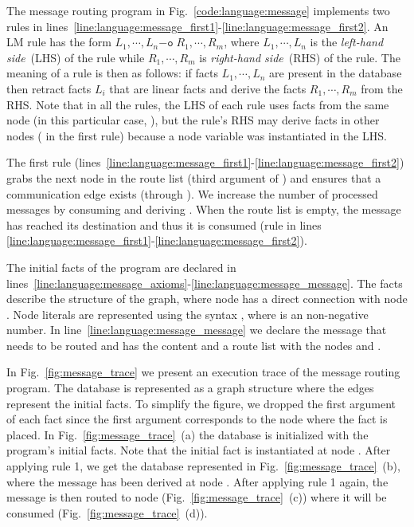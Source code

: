The message routing program in Fig.~\ref{code:language:message} implements two
rules in
lines~\ref{line:language:message_first1}-\ref{line:language:message_first2}. An
LM rule has the form $L_1, \cdots, L_n \mathtt{-o} \; R_1, \cdots, R_m$, where
$L_1, \cdots, L_n$ is the \emph{left-hand side}~(LHS) of the rule while $R_1,
\cdots, R_m$ is \emph{right-hand side}~(RHS) of the rule. The meaning of a rule
is then as follows: if facts $L_1, \cdots, L_n$ are present in the database then
retract facts $L_i$ that are linear facts and derive the facts $R_1, \cdots,
R_m$ from the RHS. Note that in all the rules, the LHS of each rule uses facts
from the same node (in this particular case, ), but the rule's RHS may
derive facts in other nodes ( in the first rule) because a node variable
was instantiated in the LHS.

The first rule
(lines~\ref{line:language:message_first1}-\ref{line:language:message_first2})
grabs the next node in the route list (third argument of ) and
ensures that a communication edge exists (through ). We
increase the number of processed messages by consuming 
and deriving .  When the route list is empty, the
message has reached its destination and thus it is consumed (rule in lines
\ref{line:language:message_first1}-\ref{line:language:message_first2}).

The initial facts of the program are declared in
lines~\ref{line:language:message_axioms}-\ref{line:language:message_message}.
The  facts describe the structure of the graph, where node
 has a direct connection with node . Node literals are
represented using the syntax , where  is an non-negative
number. In line~\ref{line:language:message_message} we declare the message that
needs to be routed and has the content  and a route list
with the nodes  and .

In Fig.~\ref{fig:message_trace} we present an execution trace of the message
routing program. The database is represented as a graph structure where the
edges represent the  initial facts. To simplify the figure, we
dropped the first argument of each fact since the first argument corresponds to
the node where the fact is placed. In Fig.~\ref{fig:message_trace}~(a) the
database is initialized with the program's initial facts. Note that the initial
 fact is instantiated at node . After applying rule 1, we
get the database represented in Fig.~\ref{fig:message_trace}~(b), where the
message has been derived at node . After applying rule 1 again, the
message is then routed to node  (Fig.~\ref{fig:message_trace}~(c))
where it will be consumed (Fig.~\ref{fig:message_trace}~(d)).

